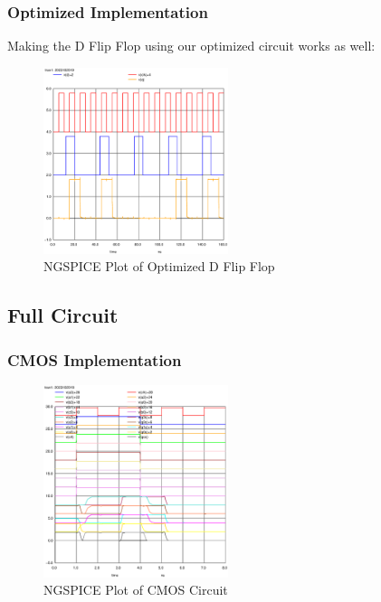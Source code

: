 \documentclass[conference]{IEEEtran}
\begin{document}
\subsubsection{Optimized Implementation}

Making the D Flip Flop using our optimized circuit works as well:

\begin{figure}[H]
    \centering
    \includegraphics[width=0.48\textwidth]{images/d_ff_optimized_tran.eps}
    \caption{NGSPICE Plot of Optimized D Flip Flop}
\end{figure}

\subsection{Full Circuit}

\subsubsection{CMOS Implementation}

\begin{figure}[H]
    \centering
    \includegraphics[width=0.48\textwidth]{images/full_cmos_tran.eps}
    \caption{NGSPICE Plot of CMOS Circuit}
\end{figure}
\end{document}
